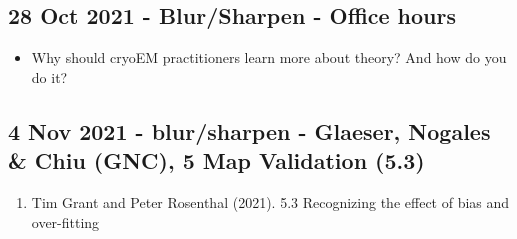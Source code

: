 \documentclass[11pt, oneside]{article}   	%
\begin{document}
\subsection{28 Oct 2021 - Blur/Sharpen - Office hours}
\begin{itemize}
	\item Why should cryoEM practitioners learn more about theory? And how do you do it?
\end{itemize}

\subsection{4 Nov 2021 - blur/sharpen - Glaeser, Nogales \& Chiu (GNC), 5 Map Validation (5.3)}

\begin{enumerate}
	\item Tim Grant and Peter Rosenthal (2021). 5.3 Recognizing the effect of bias and over-fitting
\end{enumerate}
\end{document}

